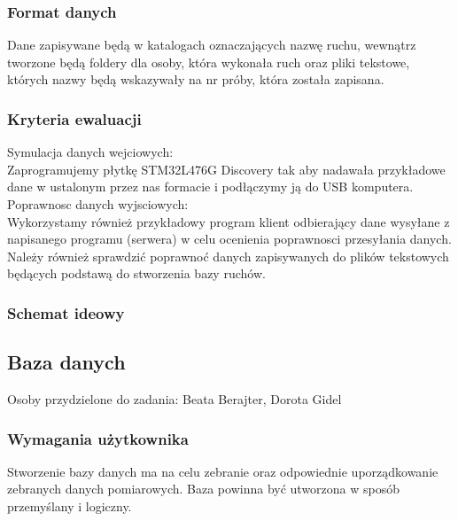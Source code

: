 \documentclass{article}
\begin{document}
\subsubsection{Format danych}
Dane zapisywane będą w katalogach oznaczających nazwę ruchu, wewnątrz tworzone będą foldery dla osoby, która wykonała ruch oraz pliki tekstowe, których nazwy będą wskazywały na nr próby, która została zapisana.
\subsubsection{Kryteria ewaluacji}
Symulacja danych wejciowych: \\
Zaprogramujemy płytkę STM32L476G Discovery tak aby nadawała przykładowe dane w ustalonym przez nas formacie i podłączymy ją do USB komputera.  \\
Poprawnosc danych wyjsciowych:\\
Wykorzystamy również przykładowy program klient odbierający dane wysyłane z napisanego programu (serwera) w celu ocenienia poprawnosci przesyłania danych.\\
Należy również sprawdzić poprawnoć danych zapisywanych do plików tekstowych będących podstawą do stworzenia bazy ruchów.
\subsubsection{Schemat ideowy}

\subsection{Baza danych}
Osoby przydzielone do zadania: Beata Berajter, Dorota Gidel
\subsubsection{Wymagania użytkownika}
Stworzenie bazy danych ma na celu zebranie oraz odpowiednie uporządkowanie zebranych danych pomiarowych. Baza powinna być utworzona w sposób przemyślany i logiczny.
\end{document}
